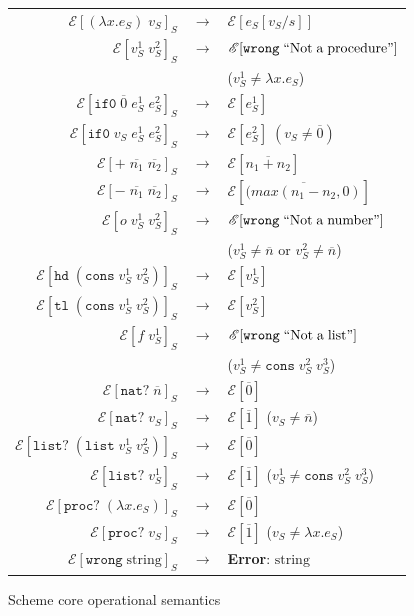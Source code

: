 \begin{figure}
\onehalfspacing
\begin{center}
\begin{tabular}{rcl}
$\mathscr{E}[(\lambda x.e_{S})\;v_{S}]_{S}$ & $\rightarrow$ & $\mathscr{E}[e_{S}[v_{S}/s]]$ \\
$\mathscr{E}[v_{S}^{1}\;v_{S}^{2}]_{S}$ & $\rightarrow$ & $\mathscr{E}[\mathtt{wrong}\;\mathrm{``Not\;a\;procedure"}]$ \\
&& ($v_{S}^{1}\neq\lambda x.e_{S}$) \\
$\mathscr{E}[\mathtt{if0}\;\overline{0}\;e_{S}^{1}\;e_{S}^{2}]_{S}$ & $\rightarrow$ & $\mathscr{E}[e_{S}^{1}]$ \\
$\mathscr{E}[\mathtt{if0}\;v_{S}\;e_{S}^{1}\;e_{S}^{2}]_{S}$ & $\rightarrow$ & $\mathscr{E}[e_{S}^{2}]\;(v_{S}\neq\overline{0})$ \\
$\mathscr{E}[+\;\overline{n_{1}}\;\overline{n_{2}}]_{S}$ & $\rightarrow$ & $\mathscr{E}[\overline{n_{1}+n_{2}}]$ \\
$\mathscr{E}[-\;\overline{n_{1}}\;\overline{n_{2}}]_{S}$ & $\rightarrow$ & $\mathscr{E}[\overline{(max(n_{1}-n_{2},0)}]$ \\
$\mathscr{E}[o\;v_{S}^{1}\;v_{S}^{2}]_{S}$ & $\rightarrow$ & $\mathscr{E}[\mathtt{wrong}\;\mathrm{``Not\;a\;number"}]$ \\
&& ($v_{S}^{1}\neq\overline{n}$ or $v_{S}^{2}\neq\overline{n}$) \\
$\mathscr{E}[\mathtt{hd}\;(\mathtt{cons}\;v_{S}^{1}\;v_{S}^{2})]_{S}$ & $\rightarrow$ & $\mathscr{E}[v_{S}^{1}]$ \\
$\mathscr{E}[\mathtt{tl}\;(\mathtt{cons}\;v_{S}^{1}\;v_{S}^{2})]_{S}$ & $\rightarrow$ & $\mathscr{E}[v_{S}^{2}]$ \\
$\mathscr{E}[f\;v_{S}^{1}]_{S}$ & $\rightarrow$ & $\mathscr{E}[\mathtt{wrong}\;\mathrm{``Not\;a\;list"}]$ \\
&& ($v_{S}^{1}\neq\mathtt{cons}\;v_{S}^{2}\;v_{S}^{3}$) \\
$\mathscr{E}[\mathtt{nat?}\;\overline{n}]_{S}$ & $\rightarrow$ & $\mathscr{E}[\overline{0}]$ \\
$\mathscr{E}[\mathtt{nat?}\;v_{S}]_{S}$ & $\rightarrow$ & $\mathscr{E}[\overline{1}]$ ($v_{S}\neq\overline{n}$) \\
$\mathscr{E}[\mathtt{list?}\;(\mathtt{list}\;v_{S}^{1}\;v_{S}^{2})]_{S}$ & $\rightarrow$ & $\mathscr{E}[\overline{0}]$ \\
$\mathscr{E}[\mathtt{list?}\;v_{S}^{1}]_{S}$ & $\rightarrow$ & $\mathscr{E}[\overline{1}]$ ($v_{S}^{1}\neq\mathtt{cons}\;v_{S}^{2}\;v_{S}^{3}$) \\
$\mathscr{E}[\mathtt{proc?}\;(\lambda x.e_{S})]_{S}$ & $\rightarrow$ & $\mathscr{E}[\overline{0}]$ \\
$\mathscr{E}[\mathtt{proc?}\;v_{S}]_{S}$ & $\rightarrow$ & $\mathscr{E}[\overline{1}]$ ($v_{S}\neq\lambda x.e_{S}$) \\
$\mathscr{E}[\mathtt{wrong}\;\mathrm{string}]_{S}$ & $\rightarrow$ & \textbf{Error}: $\mathrm{string}$
\end{tabular}
\end{center}
\caption{Scheme core operational semantics}
\label{fig:scos}
\end{figure}